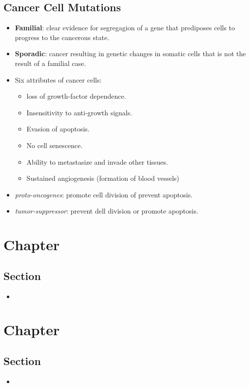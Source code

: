 \documentclass[12pt,a4paper]{article}
\begin{document}
\subsection{Cancer Cell Mutations}
\begin{itemize}
    \item \textbf{Familial}: clear evidence for segregagion of a gene that prediposes cells to progress to the cancerous state.
    \item \textbf{Sporadic}: cancer resulting in genetic changes in somatic cells that is not the result of a familial case.
    \item Six attributes of cancer cells:
        \begin{itemize}
            \item loss of growth-factor dependence.
            \item Insensitivity to anti-growth signals.
            \item Evasion of apoptosis.
            \item No cell senescence.
            \item Ability to metastasize and invade other tissues.
            \item Sustained angiogenesis (formation of blood vessels)
        \end{itemize}
    \item \textit{proto-oncogenes}: promote cell division of prevent apoptosis.
    \item \textit{tumor-suppressor}: prevent dell division or promote apoptosis.
\end{itemize}


\clearpage
\section{Chapter}
\subsection{Section}
\begin{itemize}
    \item 
\end{itemize}

\clearpage
\section{Chapter}
\subsection{Section}
\begin{itemize}
    \item 
\end{itemize}
\end{document}

